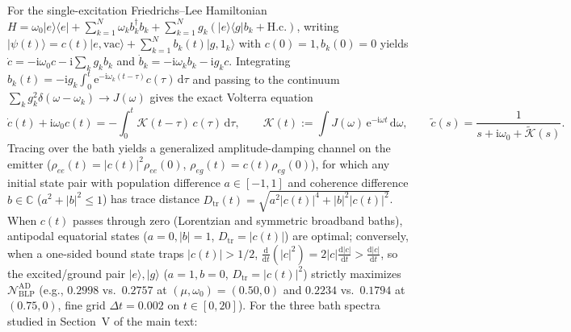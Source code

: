 \documentclass[onecolumn,10pt,notitlepage,amsmath,amssymb,floatfix]{revtex4-2}
\theoremstyle{plain}
\theoremstyle{definition}
\newcommand{\dd}{\mathrm{d}}
\newcommand{\ii}{\mathrm{i}}
\newcommand{\ee}{\mathrm{e}}
\newcommand{\NBLP}{\mathcal{N}_{\mathrm{BLP}}}
\begin{document}
For the single-excitation Friedrichs--Lee Hamiltonian $H = \omega_0|e\rangle\langle e| + \sum_{k=1}^N \omega_k b_k^\dagger b_k + \sum_{k=1}^N g_k(|e\rangle\langle g|b_k + \mathrm{H.c.})$, writing $|\psi(t)\rangle = c(t)|e,\mathrm{vac}\rangle + \sum_{k=1}^N b_k(t)|g, 1_k\rangle$ with $c(0)=1, b_k(0)=0$ yields $\dot{c} = -\ii\omega_0 c - \ii\sum_k g_k b_k$ and $\dot{b}_k = -\ii\omega_k b_k - \ii g_k c$. Integrating $b_k(t) = -\ii g_k\int_0^t \ee^{-\ii\omega_k(t-\tau)} c(\tau)\,\dd\tau$ and passing to the continuum $\sum_k g_k^2 \delta(\omega-\omega_k) \to J(\omega)$ gives the exact Volterra equation
\begin{equation}
\label{eq:S6_volterra}
\dot{c}(t) + \ii\omega_0 c(t) = -\int_0^t \mathcal{K}(t-\tau)\,c(\tau)\,\dd\tau, \qquad
\mathcal{K}(t) := \int J(\omega)\,\ee^{-\ii\omega t}\,\dd\omega, \qquad
\tilde{c}(s) = \frac{1}{s + \ii\omega_0 + \tilde{\mathcal{K}}(s)}.
\end{equation}
Tracing over the bath yields a generalized amplitude-damping channel on the emitter ($\rho_{ee}(t) = |c(t)|^2\rho_{ee}(0)$, $\rho_{eg}(t) = c(t)\rho_{eg}(0)$), for which any initial state pair with population difference $a \in [-1,1]$ and coherence difference $b \in \mathbb{C}$ ($a^2 + |b|^2 \le 1$) has trace distance $D_{\mathrm{tr}}(t) = \sqrt{a^2|c(t)|^4 + |b|^2|c(t)|^2}$. When $c(t)$ passes through zero (Lorentzian and symmetric broadband baths), antipodal equatorial states ($a=0, |b|=1$, $D_{\mathrm{tr}}=|c(t)|$) are optimal; conversely, when a one-sided bound state traps $|c(t)| > 1/2$, $\frac{\dd}{\dd t}(|c|^2) = 2|c|\frac{\dd|c|}{\dd t} > \frac{\dd|c|}{\dd t}$, so the excited/ground pair $|e\rangle, |g\rangle$ ($a=1, b=0$, $D_{\mathrm{tr}} = |c(t)|^2$) strictly maximizes $\NBLP^{\mathrm{AD}}$ (e.g., $0.2998$ vs.\ $0.2757$ at $(\mu,\omega_0)=(0.50,0)$ and $0.2234$ vs.\ $0.1794$ at $(0.75,0)$, fine grid $\Delta t = 0.002$ on $t \in [0,20]$). For the three bath spectra studied in Section~V of the main text:
\end{document}
